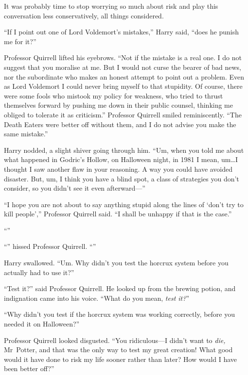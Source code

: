 It was probably time to stop worrying so much about risk and play this
conversation less conservatively, all things considered.

“If I point out one of Lord Voldemort’s mistakes,” Harry said, “does he punish
me for it?”

Professor Quirrell lifted his eyebrows. “Not if the mistake is a real one. I do
not suggest that you moralise at me. But I would not curse the bearer of bad
news, nor the subordinate who makes an honest attempt to point out a problem.
Even as Lord Voldemort I could never bring myself to that stupidity. Of course,
there were some fools who mistook my policy for weakness, who tried to thrust
themselves forward by pushing me down in their public counsel, thinking me
obliged to tolerate it as criticism.” Professor Quirrell smiled reminiscently.
“The Death Eaters were better off without them, and I do not advise you make
the same mistake.”

Harry nodded, a slight shiver going through him. “Um, when you told me about
what happened in Godric’s Hollow, on Halloween night, in 1981 I mean,
um…I thought I saw another flaw in your reasoning. A way you could have
avoided disaster. But, um, I think you have a blind spot, a class of strategies
you don’t consider, so you didn’t see it even afterward—”

“I hope you are not about to say anything stupid along the lines of ‘don’t try
to kill people’,” Professor Quirrell said. “I shall be unhappy if that is the
case.”

“”

“” hissed Professor Quirrell. “”

Harry swallowed. “Um. Why didn’t you test the horcrux system before you
actually had to use it?”

“Test it?” said Professor Quirrell. He looked up from the brewing potion, and
indignation came into his voice. “What do you mean, \emph{test it?}”

“Why didn’t you test if the horcrux system was working correctly, before you
needed it on Halloween?”

Professor Quirrell looked disgusted. “You ridiculous—I didn’t want to
\emph{die,} Mr~Potter, and that was the only way to test my great creation!
What good would it have done to risk my life sooner rather than later? How
would I have been better off?”


